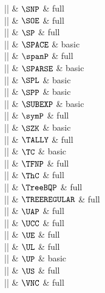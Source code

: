 |\SNP|    & $\SNP$ & full \\

|\SOE|    & $\SOE$ & full \\

|\SP|    & $\SP$ & full \\

|\SPACE|    & $\SPACE$ & basic \\

|\spanP|    & $\spanP$ & full \\

|\SPARSE|    & $\SPARSE$ & basic \\

|\SPL|    & $\SPL$ & basic \\

|\SPP|    & $\SPP$ & basic \\

|\SUBEXP|    & $\SUBEXP$ & basic \\

|\symP|    & $\symP$ & full \\

|\SZK|    & $\SZK$ & basic \\

|\TALLY|    & $\TALLY$ & full \\

|\TC|    & $\TC$ & basic \\

|\TFNP|    & $\TFNP$ & full \\

|\ThC|    & $\ThC$ & full \\

|\TreeBQP|    & $\TreeBQP$ & full \\

|\TREEREGULAR|    & $\TREEREGULAR$ & full \\

|\UAP|    & $\UAP$ & full \\

|\UCC|    & $\UCC$ & full \\

|\UE|    & $\UE$ & full \\

|\UL|    & $\UL$ & full \\

|\UP|    & $\UP$ & basic \\

|\US|    & $\US$ & full \\

|\VNC|    & $\VNC$ & full \\

